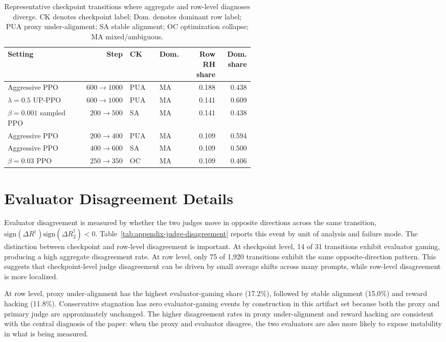 \documentclass[11pt]{article}
\newcommand{\Rdag}{R^{\dagger}}
\newcommand{\Rtwo}{R^{\dagger}_2}
\newcommand{\delt}{\Delta}
\begin{document}
\begin{table}[h]
\centering
\tiny
\caption{Representative checkpoint transitions where aggregate and row-level diagnoses diverge. CK denotes checkpoint label; Dom. denotes dominant row label; PUA proxy under-alignment; SA stable alignment; OC optimization collapse; MA mixed/ambiguous.}
\label{tab:aggregation-flips}
\begin{tabular}{p{0.32\linewidth}rp{0.12\linewidth}p{0.12\linewidth}rr}
\toprule
Setting & Step & CK & Dom. & Row RH share & Dom. share \\
\midrule
Aggressive PPO & $600\to1000$ & PUA & MA & 0.188 & 0.438 \\
$\lambda=0.5$ UP-PPO & $600\to1000$ & PUA & MA & 0.141 & 0.609 \\
$\beta=0.001$ sampled PPO & $200\to500$ & SA & MA & 0.141 & 0.438 \\
Aggressive PPO & $200\to400$ & PUA & MA & 0.109 & 0.594 \\
Aggressive PPO & $400\to600$ & SA & MA & 0.109 & 0.500 \\
$\beta=0.03$ PPO & $250\to350$ & OC & MA & 0.109 & 0.406 \\
\bottomrule
\end{tabular}
\end{table}

\section{Evaluator Disagreement Details}
\label{app:evaluator-disagreement-details}
Evaluator disagreement is measured by whether the two judges move in opposite directions across the same transition, $\mathrm{sign}(\delt\Rdag)\mathrm{sign}(\delt\Rtwo)<0$. Table~\ref{tab:appendix-judge-disagreement} reports this event by unit of analysis and failure mode. The distinction between checkpoint and row-level disagreement is important. At checkpoint level, 14 of 31 transitions exhibit evaluator gaming, producing a high aggregate disagreement rate. At row level, only 75 of 1,920 transitions exhibit the same opposite-direction pattern. This suggests that checkpoint-level judge disagreement can be driven by small average shifts across many prompts, while row-level disagreement is more localized.

At row level, proxy under-alignment has the highest evaluator-gaming share (17.2\%), followed by stable alignment (15.0\%) and reward hacking (11.8\%). Conservative stagnation has zero evaluator-gaming events by construction in this artifact set because both the proxy and primary judge are approximately unchanged. The higher disagreement rates in proxy under-alignment and reward hacking are consistent with the central diagnosis of the paper: when the proxy and evaluator disagree, the two evaluators are also more likely to expose instability in what is being measured.
\end{document}
